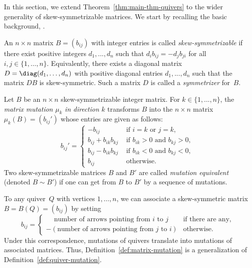 In this section, we extend Theorem~\ref{thm:main-thm-quivers} to the wider generality of skew-sym\-met\-rizable matrices. 
We start by recalling the basic background, \cf \eg \cite[Section~2.7]{FWZ}. 

\begin{definition} 
An $n \times n$ matrix $B = (b_{ij})$ with integer entries is called
\emph{skew-symmetrizable} if there exist positive integers $d_1,..., d_n$ such that $d_ib_{ij} = -d_j b_{ji}$ for all $i,j\in\{1,\dots,n\}$. 
Equivalently, there exists a diagonal matrix $D=\diag(d_1,\dots,d_n)$ with positive diagonal entries $d_1,...,d_n$ such that the matrix $DB$ is skew-symmetric. Such a matrix $D$ is called a \emph{symmetrizer} for~$B$. 
\end{definition}

\begin{definition} 
\label{def:matrix-mutation}
Let $B$ be an $n \times n$ skew-symmetrizable
integer matrix. 
For $k\in\{1,...,n\}$, the \emph{matrix mutation $\mu_k$ in direction $k$} transforms $B$ into
the $n \times n$ matrix $\mu_k(B)=(b_{ij}')$ whose entries are given as follows:
\begin{equation}
\label{eq:matrix-mutation}
b_{ij}'=
\begin{cases} -b_{ij} &\text{ if }i=k\text{ or }j=k, \\
b_{ij}+b_{ik}b_{kj} &\text{ if }b_{ik}>0\text{ and }b_{kj}>0,\\
b_{ij}-b_{ik}b_{kj} &\text{ if }b_{ik}<0\text{ and }b_{kj}<0,\\ 
b_{ij} &\text{ otherwise.} 
\end{cases}
\end{equation}
Two skew-symmetrizable matrices $B$ and $B'$ are called \emph{mutation
equivalent} (denoted \hbox{$B\sim B'$}) if one can get from $B$ to $B'$ by a sequence of mutations.
\end{definition}

\begin{remark}
To any quiver~$Q$ with vertices $1,\dots,n$, we can associate a skew-symmetric matrix $B=B(Q)=(b_{ij})$ by setting
\[
b_{ij}=\begin{cases}
\quad \, \text{number of arrows pointing from $i$ to~$j$} &\text{if there are any,}\\
-(\text{number of arrows pointing from $j$ to~$i$}) &\text{otherwise.}
\end{cases}
\]
Under this correspondence, mutations of quivers translate into mutations of associated matrices. Thus, Definition~\ref{def:matrix-mutation} is a generalization of Definition~\ref{def:quiver-mutation}. 
\end{remark}

